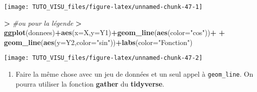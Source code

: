 \documentclass[]{book}
\newenvironment{Shaded}{\begin{snugshade}}{\end{snugshade}}
\newcommand{\CommentTok}[1]{\textcolor[rgb]{0.56,0.35,0.01}{\textit{#1}}}
\newcommand{\DataTypeTok}[1]{\textcolor[rgb]{0.13,0.29,0.53}{#1}}
\newcommand{\ErrorTok}[1]{\textcolor[rgb]{0.64,0.00,0.00}{\textbf{#1}}}
\newcommand{\KeywordTok}[1]{\textcolor[rgb]{0.13,0.29,0.53}{\textbf{#1}}}
\newcommand{\NormalTok}[1]{#1}
\newcommand{\OperatorTok}[1]{\textcolor[rgb]{0.81,0.36,0.00}{\textbf{#1}}}
\newcommand{\StringTok}[1]{\textcolor[rgb]{0.31,0.60,0.02}{#1}}
\providecommand{\tightlist}{%
  \setlength{\itemsep}{0pt}\setlength{\parskip}{0pt}}
\theoremstyle{definition}
\theoremstyle{definition}
\theoremstyle{definition}
\theoremstyle{remark}
\begin{document}
\begin{center}\texttt{[image: TUTO\_VISU\_files/figure-latex/unnamed-chunk-47-1]} \end{center}

\begin{Shaded}
\begin{Highlighting}[]
\OperatorTok{>}\StringTok{ }\CommentTok{#ou pour la légende}
\ErrorTok{>}\StringTok{ }\KeywordTok{ggplot}\NormalTok{(donnees)}\OperatorTok{+}\KeywordTok{aes}\NormalTok{(}\DataTypeTok{x=}\NormalTok{X,}\DataTypeTok{y=}\NormalTok{Y1)}\OperatorTok{+}\KeywordTok{geom_line}\NormalTok{(}\KeywordTok{aes}\NormalTok{(}\DataTypeTok{color=}\StringTok{"cos"}\NormalTok{))}\OperatorTok{+}
\OperatorTok{+}\StringTok{   }\KeywordTok{geom_line}\NormalTok{(}\KeywordTok{aes}\NormalTok{(}\DataTypeTok{y=}\NormalTok{Y2,}\DataTypeTok{color=}\StringTok{"sin"}\NormalTok{))}\OperatorTok{+}\KeywordTok{labs}\NormalTok{(}\DataTypeTok{color=}\StringTok{"Fonction"}\NormalTok{)}
\end{Highlighting}
\end{Shaded}

\begin{center}\texttt{[image: TUTO\_VISU\_files/figure-latex/unnamed-chunk-47-2]} \end{center}

\begin{enumerate}
\def\labelenumi{\arabic{enumi}.}
\setcounter{enumi}{2}
\tightlist
\item
  Faire la même chose avec un jeu de données et un seul appel à \texttt{geom\_line}. On pourra utiliser la fonction \textbf{gather} du \textbf{tidyverse}.
\end{enumerate}

\begin{Shaded}
\end{Shaded}
\end{document}

